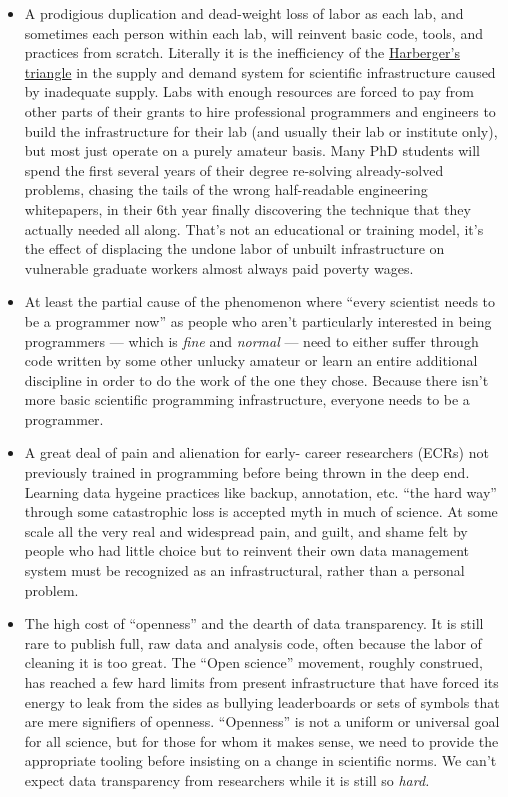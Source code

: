 \documentclass[notoc]{tufte-book}
\begin{document}
\begin{itemize}

\item
  A prodigious duplication and dead-weight loss of labor as each lab,
  and sometimes each person within each lab, will reinvent basic code,
  tools, and practices from scratch. Literally it is the inefficiency of
  the
  \href{https://en.wikipedia.org/wiki/Deadweight_loss\#Harberger's_triangle}{Harberger's
  triangle} in the supply and demand system for scientific
  infrastructure caused by inadequate supply. Labs with enough resources
  are forced to pay from other parts of their grants to hire
  professional programmers and engineers to build the infrastructure for
  their lab (and usually their lab or institute only), but most just
  operate on a purely amateur basis. Many PhD students will spend the
  first several years of their degree re-solving already-solved
  problems, chasing the tails of the wrong half-readable engineering
  whitepapers, in their 6th year finally discovering the technique that
  they actually needed all along. That's not an educational or training
  model, it's the effect of displacing the undone labor of unbuilt
  infrastructure on vulnerable graduate workers almost always paid
  poverty wages.
\item
  At least the partial cause of the phenomenon where ``every scientist
  needs to be a programmer now'' as people who aren't particularly
  interested in being programmers --- which is \emph{fine} and
  \emph{normal} --- need to either suffer through code written by some
  other unlucky amateur or learn an entire additional discipline in
  order to do the work of the one they chose. Because there isn't more
  basic scientific programming infrastructure, everyone needs to be a
  programmer.
\item
  A great deal of pain and alienation for early- career researchers
  (ECRs) not previously trained in programming before being thrown in
  the deep end. Learning data hygeine practices like backup, annotation,
  etc. ``the hard way'' through some catastrophic loss is accepted myth
  in much of science. At some scale all the very real and widespread
  pain, and guilt, and shame felt by people who had little choice but to
  reinvent their own data management system must be recognized as an
  infrastructural, rather than a personal problem.
\item
  The high cost of ``openness'' and the dearth of data transparency. It
  is still rare to publish full, raw data and analysis code, often
  because the labor of cleaning it is too great. The ``Open science''
  movement, roughly construed, has reached a few hard limits from
  present infrastructure that have forced its energy to leak from the
  sides as bullying leaderboards or sets of symbols that are mere
  signifiers of openness. ``Openness'' is not a uniform or universal
  goal for all science, but for those for whom it makes sense, we need
  to provide the appropriate tooling before insisting on a change in
  scientific norms. We can't expect data transparency from researchers
  while it is still so \emph{hard.}
\end{itemize}
\end{document}
